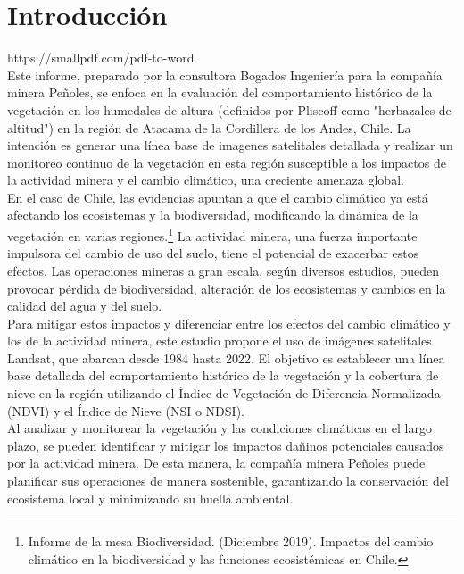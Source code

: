 \maketitle
\section{Introducción}

https://smallpdf.com/pdf-to-word \\

Este informe, preparado por la consultora Bogados Ingeniería para la compañía minera Peñoles, se enfoca en la evaluación del comportamiento histórico de la vegetación en los humedales de altura (definidos por Pliscoff como "herbazales de altitud") en la región de Atacama de la Cordillera de los Andes, Chile. La intención es generar una línea base de imagenes satelitales detallada  y realizar un monitoreo continuo de la vegetación en esta región susceptible a los impactos de la actividad minera y el cambio climático, una creciente amenaza global.\\

En el caso de Chile, las evidencias apuntan a que el cambio climático ya está afectando los ecosistemas y la biodiversidad, modificando la dinámica de la vegetación en varias regiones.\footnote{Informe de la mesa Biodiversidad. (Diciembre 2019). Impactos del cambio climático en la biodiversidad y las funciones ecosistémicas en Chile.} La actividad minera, una fuerza importante impulsora del cambio de uso del suelo, tiene el potencial de exacerbar estos efectos. Las operaciones mineras a gran escala, según diversos estudios, pueden provocar pérdida de biodiversidad, alteración de los ecosistemas y cambios en la calidad del agua y del suelo.\\

Para mitigar estos impactos y diferenciar entre los efectos del cambio climático y los de la actividad minera, este estudio propone el uso de imágenes satelitales Landsat, que abarcan desde 1984 hasta 2022. El objetivo es establecer una línea base detallada del comportamiento histórico de la vegetación y la cobertura de nieve en la región utilizando el Índice de Vegetación de Diferencia Normalizada (NDVI) y el Índice de Nieve (NSI o NDSI).\\

Al analizar y monitorear la vegetación y las condiciones climáticas en el largo plazo, se pueden identificar y mitigar los impactos dañinos potenciales causados por la actividad minera. De esta manera, la compañía minera Peñoles puede planificar sus operaciones de manera sostenible, garantizando la conservación del ecosistema local y minimizando su huella ambiental.\\

